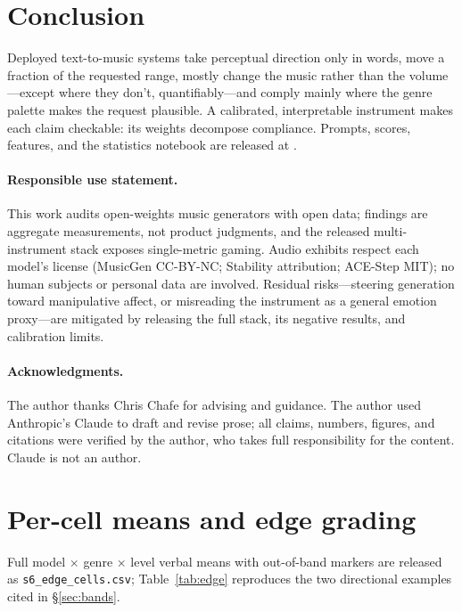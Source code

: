 \documentclass{article}
\begin{document}
\section{Conclusion}
\label{sec:conclusion}

Deployed text-to-music systems take perceptual direction only in words,
move a fraction of the requested range, mostly
change the music rather than the volume---except where they don't, quantifiably---and comply mainly
where the genre palette
makes the request plausible. A calibrated, interpretable instrument makes each claim checkable: its weights decompose compliance. Prompts, scores, features, and the statistics notebook are released at \repourl{}.

\paragraph{Responsible use statement.}

This work audits open-weights music generators with open data; findings are aggregate measurements, not product judgments, and the released
multi-instrument stack exposes single-metric gaming. Audio exhibits respect each model's license (MusicGen CC-BY-NC; Stability attribution; ACE-Step MIT); no human subjects or personal data are involved. Residual risks---steering generation toward manipulative affect, or misreading the instrument as a general emotion proxy---are mitigated by releasing the full stack, its negative results, and calibration limits.

\paragraph{Acknowledgments.}
The author thanks Chris Chafe for advising and guidance. The author used
Anthropic's Claude to draft and revise prose; all claims, numbers, figures,
and citations were verified by the author, who takes full responsibility for
the content. Claude is not an author.




\appendix

\section{Per-cell means and edge grading}
\label{app:edge}
Full model $\times$ genre $\times$ level verbal means with out-of-band
markers are released as \texttt{s6\_edge\_cells.csv}; Table~\ref{tab:edge}
reproduces the two directional examples cited in \S\ref{sec:bands}.
\end{document}

